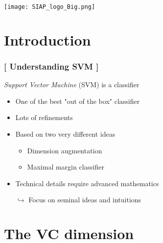 \documentclass[xcolor=x11names,compress, handhouts]{beamer}
\renewcommand{\(}{\begin{columns}}
\renewcommand{\)}{\end{columns}}
\newcommand{\<}[1]{\begin{column}{#1}}
\renewcommand{\>}{\end{column}}
\begin{document}
\begin{frame}
\Large{ \color{siap}{Machine Learning for Official Statistics \& SDGs}}

\hspace{1cm}


\hspace{2cm}
\begin{center}

\texttt{[image: SIAP\_logo\_Big.png]}

\end{center}
\end{frame}



\section{Introduction}


\begin{frame} %
\frametitle{\textcolor{brique}{[ Understanding  SVM   ]}}
\textit{Support Vector Machine} (SVM) is a classifier\\
\pause
\begin{itemize}[<+->]
  \item One of the best "out of the box" classifier
  \item Lots of refinements
  \item Based on two very different ideas
  \begin{itemize}[<+->]
    \item Dimension augmentation
    \item Maximal margin classifier
  \end{itemize}
  \item Technical details require advanced mathematics
  \item[$\hookrightarrow$] Focus on seminal ideas and intuitions
\end{itemize}
\end{frame}

\section{The VC dimension}
\end{document}
